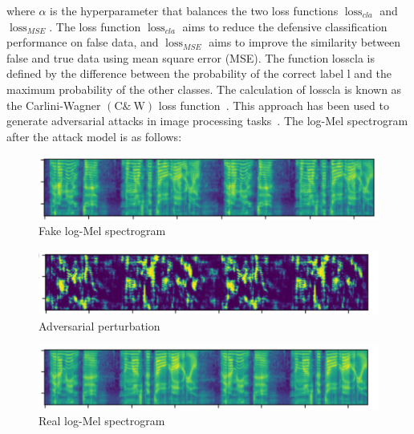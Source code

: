 where $\alpha$ is the hyperparameter that balances the two loss functions $\operatorname{loss}_{c l a}$ and $\operatorname{loss}_{M S E}$. The loss function $\operatorname{loss}_{c l a}$ aims to reduce the defensive classification performance on false data, and $\operatorname{loss}_{M S E}$ aims to improve the similarity between false and true data using mean square error (MSE). The function losscla is defined by the difference between the probability of the correct label l and the maximum probability of the other classes. The calculation of losscla is known as the Carlini-Wagner $(\mathrm{C} \& \mathrm{~W})$ loss function~\cite{bose2018adversarial}. This approach has been used to generate adversarial attacks in image processing tasks~\cite{akhtar2018threat,bose2018adversarial}.
The log-Mel spectrogram after the attack model is as follows:
\begin{figure}[!hbtp]
	\centering
	\includegraphics[width=0.9\linewidth]{figures_ning/mel-2}
	\caption[Fake log-Mel spectrogram]{Fake log-Mel spectrogram}
	\label{fig:mel-2}
\end{figure}

\begin{figure}[!hbtp]
	\centering
	\includegraphics[width=0.9\linewidth]{figures_ning/mel-3}
	\caption[Adversarial perturbation]{Adversarial perturbation}
	\label{fig:mel-3}
\end{figure}

\begin{figure}[!hbtp]
	\centering
	\includegraphics[width=0.9\linewidth]{figures_ning/mel-4}
	\caption[Real log-Mel spectrogram]{Real log-Mel spectrogram}
	\label{fig:mel-4}
\end{figure}


